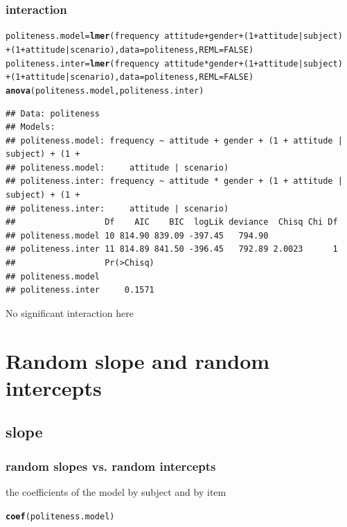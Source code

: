 \documentclass[10p]{beamer}\usepackage[]{graphicx}\usepackage[]{color}
\makeatletter
\newcommand{\hlnum}[1]{\textcolor[rgb]{0.686,0.059,0.569}{#1}}%
\newcommand{\hlopt}[1]{\textcolor[rgb]{0,0,0}{#1}}%
\newcommand{\hlstd}[1]{\textcolor[rgb]{0.345,0.345,0.345}{#1}}%
\newcommand{\hlkwb}[1]{\textcolor[rgb]{0.69,0.353,0.396}{#1}}%
\newcommand{\hlkwc}[1]{\textcolor[rgb]{0.333,0.667,0.333}{#1}}%
\newcommand{\hlkwd}[1]{\textcolor[rgb]{0.737,0.353,0.396}{\textbf{#1}}}%
\newenvironment{kframe}{%
 \def\at@end@of@kframe{}%
 \ifinner\ifhmode%
  \def\at@end@of@kframe{\end{minipage}}%
  \begin{minipage}{\columnwidth}%
 \fi\fi%
 \def\FrameCommand##1{\hskip\@totalleftmargin \hskip-\fboxsep
 \colorbox{shadecolor}{##1}\hskip-\fboxsep
     \hskip-\linewidth \hskip-\@totalleftmargin \hskip\columnwidth}%
 \MakeFramed {\advance\hsize-\width
   \@totalleftmargin\z@ \linewidth\hsize
   \@setminipage}}%
 {\par\unskip\endMakeFramed%
 \at@end@of@kframe}
\newenvironment{knitrout}{}{} %
\makeatother
\begin{document}
\begin{frame}[fragile]
\frametitle{interaction}
\begin{knitrout}\scriptsize
{}\color{fgcolor}\begin{kframe}
\begin{alltt}
\hlstd{politeness.model} \hlkwb{=} \hlkwd{lmer}\hlstd{(frequency} \hlopt{~} \hlstd{attitude} \hlopt{+} \hlstd{gender} \hlopt{+} \hlstd{(}\hlnum{1}\hlopt{+}\hlstd{attitude}\hlopt{|}\hlstd{subject)}
        \hlopt{+} \hlstd{(}\hlnum{1}\hlopt{+}\hlstd{attitude}\hlopt{|}\hlstd{scenario),} \hlkwc{data}\hlstd{=politeness,} \hlkwc{REML}\hlstd{=}\hlnum{FALSE}\hlstd{)}
\hlstd{politeness.inter} \hlkwb{=} \hlkwd{lmer}\hlstd{(frequency} \hlopt{~} \hlstd{attitude} \hlopt{*} \hlstd{gender} \hlopt{+} \hlstd{(}\hlnum{1}\hlopt{+}\hlstd{attitude}\hlopt{|}\hlstd{subject)}
        \hlopt{+} \hlstd{(}\hlnum{1}\hlopt{+}\hlstd{attitude}\hlopt{|}\hlstd{scenario),} \hlkwc{data}\hlstd{=politeness,} \hlkwc{REML}\hlstd{=}\hlnum{FALSE}\hlstd{)}
\hlkwd{anova}\hlstd{(politeness.model, politeness.inter)}
\end{alltt}
\begin{verbatim}
## Data: politeness
## Models:
## politeness.model: frequency ~ attitude + gender + (1 + attitude | subject) + (1 + 
## politeness.model:     attitude | scenario)
## politeness.inter: frequency ~ attitude * gender + (1 + attitude | subject) + (1 + 
## politeness.inter:     attitude | scenario)
##                  Df    AIC    BIC  logLik deviance  Chisq Chi Df
## politeness.model 10 814.90 839.09 -397.45   794.90              
## politeness.inter 11 814.89 841.50 -396.45   792.89 2.0023      1
##                  Pr(>Chisq)
## politeness.model           
## politeness.inter     0.1571
\end{verbatim}
\end{kframe}
\end{knitrout}
No significant interaction here
\end{frame}

\section[Random slope]{Random slope and random intercepts}
\subsection{slope}

\begin{frame}[fragile]
\frametitle{random slopes vs. random intercepts}
the coefficients of the model by subject and by item
\begin{knitrout}\footnotesize
{}\color{fgcolor}\begin{kframe}
\begin{alltt}
\hlkwd{coef}\hlstd{(politeness.model)}
\end{alltt}
\end{kframe}
\end{knitrout}
\end{frame}
\end{document}
